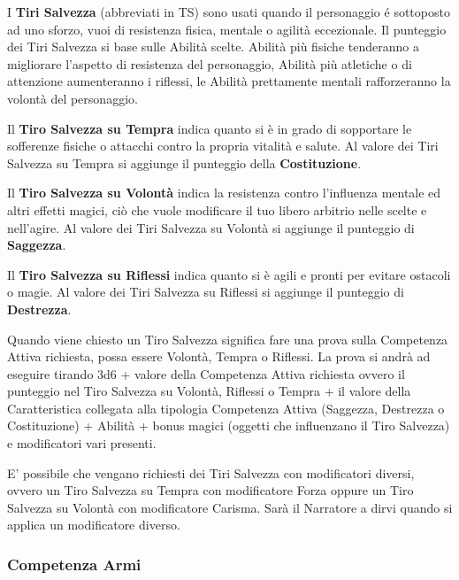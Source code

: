 \begin{multicols}{2}
I \textbf{Tiri Salvezza} (abbreviati in TS) sono usati quando il personaggio é sottoposto ad uno sforzo, vuoi di resistenza fisica, mentale o agilità eccezionale. Il punteggio dei Tiri Salvezza si base sulle Abilità scelte. Abilità più fisiche tenderanno a migliorare l'aspetto di resistenza del personaggio, Abilità più atletiche o di attenzione aumenteranno i riflessi, le Abilità prettamente mentali rafforzeranno la volontà del personaggio.

Il \textbf{Tiro Salvezza su Tempra} indica quanto si è in grado di sopportare le sofferenze fisiche o attacchi contro la propria vitalità e salute. Al valore dei Tiri Salvezza su Tempra si aggiunge il punteggio della \textbf{Costituzione}.

Il \textbf{Tiro Salvezza su Volontà} indica la resistenza contro l'influenza mentale ed altri effetti magici, ciò che vuole modificare il tuo libero arbitrio nelle scelte e nell'agire. Al valore dei Tiri Salvezza su Volontà si aggiunge il punteggio di \textbf{Saggezza}.

Il \textbf{Tiro Salvezza su Riflessi} indica quanto si è agili e pronti per evitare ostacoli o magie. Al valore dei Tiri Salvezza su Riflessi si aggiunge il punteggio di \textbf{Destrezza}.

Quando viene chiesto un Tiro Salvezza significa fare una prova sulla Competenza Attiva richiesta, possa essere Volontà, Tempra o Riflessi.
La prova si andrà ad eseguire tirando 3d6 + valore della Competenza Attiva richiesta ovvero il punteggio nel Tiro Salvezza su Volontà, Riflessi o Tempra + il valore della Caratteristica collegata alla tipologia Competenza Attiva (Saggezza, Destrezza o Costituzione) + Abilità + bonus magici (oggetti che influenzano il Tiro Salvezza) e modificatori vari presenti.

\medskip


\begin{changemargin}{0.3cm}{0.3cm}\begin{tcolorbox}[title = Tiri Salvezza non standard]
E' possibile che vengano richiesti dei Tiri Salvezza con modificatori diversi, ovvero un Tiro Salvezza su Tempra con modificatore Forza oppure un Tiro Salvezza su Volontà con modificatore Carisma. Sarà il Narratore a dirvi quando si applica un modificatore diverso.
\end{tcolorbox}\end{changemargin}

\subsubsection{Competenza Armi}\label{competenzaarmi}


\end{multicols}
